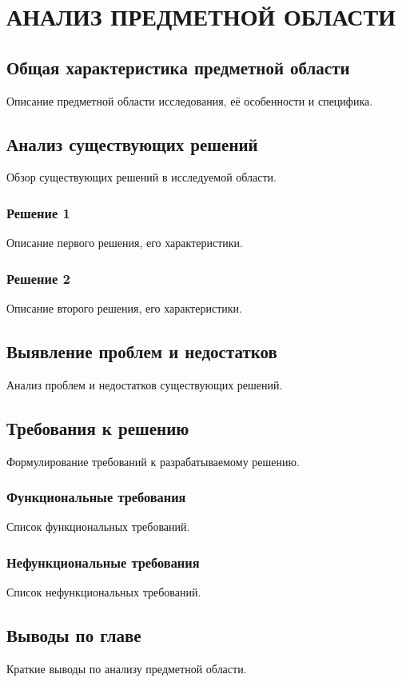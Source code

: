 \chapter{АНАЛИЗ ПРЕДМЕТНОЙ ОБЛАСТИ}

\section{Общая характеристика предметной области}

Описание предметной области исследования, её особенности и специфика.

\section{Анализ существующих решений}

Обзор существующих решений в исследуемой области.

\subsection{Решение 1}

Описание первого решения, его характеристики.

\subsection{Решение 2}

Описание второго решения, его характеристики.

\section{Выявление проблем и недостатков}

Анализ проблем и недостатков существующих решений.

\section{Требования к решению}

Формулирование требований к разрабатываемому решению.

\subsection{Функциональные требования}

Список функциональных требований.

\subsection{Нефункциональные требования}

Список нефункциональных требований.

\section{Выводы по главе}

Краткие выводы по анализу предметной области.
